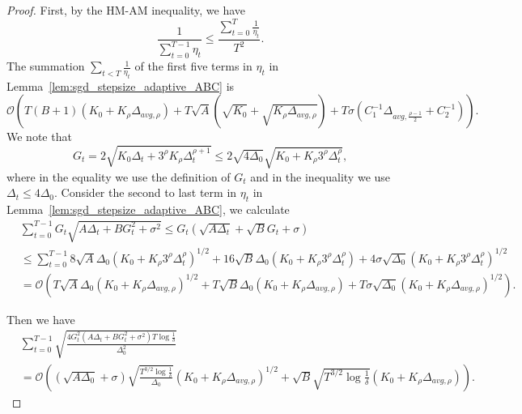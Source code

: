 \documentclass{article}
\newcommand{\Kr}{K_{\rho}}
\newcommand{\paren}[1]{\left( #1 \right)}
\begin{document}
\begin{proof}
     First, by the HM-AM inequality, we have
    \begin{equation}\label{eq:adaptive_a.s.ABC_HM-AM}
        \frac{1}{\sum_{t=0}^{T-1}\eta_t}\leq \frac{\sum_{t=0}^T \frac{1}{\eta_t}}{T^2}.
    \end{equation}
    The summation $\sum_{t<T}\frac{1}{\eta_t}$ of the first five terms in $\eta_t$ in Lemma~\ref{lem:sgd_stepsize_adaptive_ABC} is $$\mathcal{O}\paren{T(B+1)\paren{K_0+\Kr\Delta_{avg,\rho}}+T\sqrt{A}\paren{\sqrt{K_0}+\sqrt{\Kr\Delta_{avg,\rho}}}+T\sigma\paren{C_1^{-1}\Delta_{avg,\frac{\rho-1}{2}}+C_2^{-1}}}.$$
    We note that 
    $$G_t=2\sqrt{K_0\Delta_t+3^\rho\Kr\Delta_t^{\rho+1}}\leq 
    2\sqrt{4\Delta_0}\sqrt{K_0+\Kr 3^\rho\Delta_t^{\rho}},$$
    where in the equality we use the definition of $G_t$ and in the inequality we use $\Delta_t\leq 4\Delta_0$. 
    Consider the second to last term in $\eta_t$ in Lemma~\ref{lem:sgd_stepsize_adaptive_ABC}, we calculate
    \begin{align*}
        &\sum_{t=0}^{T-1}G_t\sqrt{A\Delta_t+BG_t^2+\sigma^2}\leq G_t\paren{\sqrt{A\Delta_t}+\sqrt{B}G_t+\sigma}\\
        &\leq \sum_{t=0}^{T-1} 8\sqrt{A}\Delta_0\paren{K_0+\Kr3^\rho\Delta_t^\rho}^{1/2}
        +16\sqrt{B}\Delta_0\paren{K_0+\Kr3^\rho\Delta_t^\rho}+4\sigma\sqrt{\Delta_0}\paren{K_0+\Kr3^\rho\Delta_t^\rho}^{1/2}\\
        &=\mathcal{O}\paren{T\sqrt{A}\Delta_0\paren{K_0+\Kr\Delta_{avg,\rho}}^{1/2}+T\sqrt{B}\Delta_0\paren{K_0+\Kr\Delta_{avg,\rho}}+T\sigma\sqrt{\Delta_0}\paren{K_0+\Kr\Delta_{avg,\rho}}^{1/2}}.
    \end{align*}

    Then we have
    \begin{align*}
        &\sum_{t=0}^{T-1}\sqrt{\frac{4G_t^2\paren{A\Delta_t+BG_t^2+\sigma^2}T\log\frac{1}{\delta}}{\Delta_0^2}}\\
        &=\mathcal{O}\paren{\paren{\sqrt{A\Delta_0}+\sigma}\sqrt{\frac{T^{3/2}\log\frac{1}{\delta}}{\Delta_0}}\paren{K_0+\Kr\Delta_{avg,\rho}}^{1/2}+\sqrt{B}\sqrt{T^{3/2}\log\frac{1}{\delta}}\paren{K_0+\Kr\Delta_{avg,\rho}}}.
    \end{align*}


\end{proof}
\end{document}
